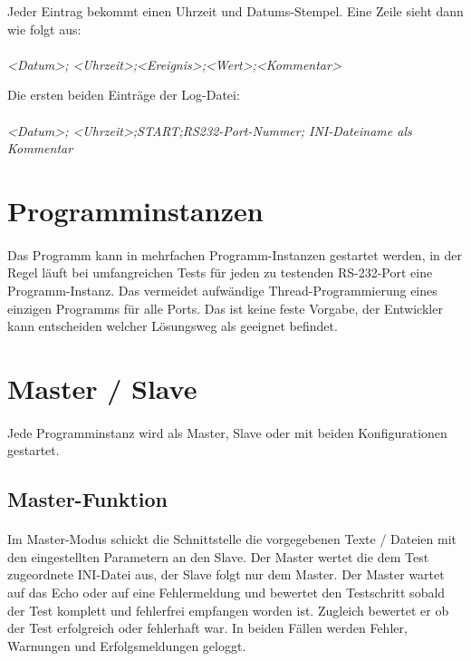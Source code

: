 Jeder Eintrag bekommt einen Uhrzeit und Datums-Stempel. Eine Zeile sieht dann wie folgt aus:
\\
\\ \hspace*{10mm} \textit{<Datum>; <Uhrzeit>;<Ereignis>;<Wert>;<Kommentar>}


Die ersten beiden  Einträge der Log-Datei:
\\
\\ \hspace*{10mm} \textit{<Datum>; <Uhrzeit>;START;RS232-Port-Nummer; INI-Dateiname als Kommentar}



\section{Programminstanzen}
\paragraph{}
Das Programm kann in mehrfachen Programm-Instanzen gestartet werden, in der Regel läuft bei umfangreichen Tests für jeden zu testenden RS-232-Port eine Programm-Instanz. Das vermeidet aufwändige Thread-Programmierung eines einzigen Programms für alle Ports. Das ist keine feste Vorgabe, der Entwickler kann entscheiden welcher Lösungsweg  als geeignet befindet.

\section{Master / Slave}
\paragraph{}
Jede Programminstanz wird als Master, Slave oder mit beiden Konfigurationen gestartet.


\subsection{Master-Funktion}
\paragraph{}
Im Master-Modus schickt die Schnittstelle die vorgegebenen Texte / Dateien mit den eingestellten Parametern an den Slave. Der Master wertet die dem Test zugeordnete INI-Datei aus, der Slave folgt nur dem Master. Der Master wartet auf das Echo oder auf eine Fehlermeldung und bewertet den Testschritt sobald der Test komplett und fehlerfrei empfangen worden ist. Zugleich bewertet er ob der Test erfolgreich oder fehlerhaft war. In beiden Fällen werden Fehler, Warnungen und Erfolgsmeldungen geloggt.


